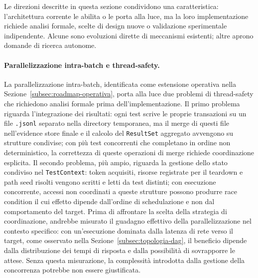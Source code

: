 Le direzioni descritte in questa sezione condividono una caratteristica: l'architettura corrente le abilita o le porta alla luce, ma la loro implementazione richiede analisi formale, scelte di design nuove o validazione sperimentale indipendente. Alcune sono evoluzioni dirette di meccanismi esistenti; altre aprono domande di ricerca autonome.

\paragraph{Parallelizzazione intra-batch e thread-safety.}
La parallelizzazione intra-batch, identificata come estensione operativa nella Sezione~\ref{subsec:roadmap-operativa}, porta alla luce due problemi di thread-safety che richiedono analisi formale prima dell'implementazione. Il primo problema riguarda l'integrazione dei risultati: ogni test scrive le proprie transazioni su un file \texttt{.jsonl} separato nella directory temporanea, ma il merge di questi file nell'evidence store finale e il calcolo del \texttt{ResultSet} aggregato avvengono su strutture condivise; con più test concorrenti che completano in ordine non deterministico, la correttezza di queste operazioni di merge richiede coordinazione esplicita. Il secondo problema, più ampio, riguarda la gestione dello stato condiviso nel \texttt{TestContext}: token acquisiti, risorse registrate per il teardown e path seed risolti vengono scritti e letti da test distinti; con esecuzione concorrente, accessi non coordinati a queste strutture possono produrre race condition il cui effetto dipende dall'ordine di schedulazione e non dal comportamento del target. Prima di affrontare la scelta della strategia di coordinazione, andrebbe misurato il guadagno effettivo della parallelizzazione nel contesto specifico: con un'esecuzione dominata dalla latenza di rete verso il target, come osservato nella Sezione~\ref{subsec:topologia-dag}, il beneficio dipende dalla distribuzione dei tempi di risposta e dalla possibilità di sovrapporre le attese. Senza questa misurazione, la complessità introdotta dalla gestione della concorrenza potrebbe non essere giustificata.

